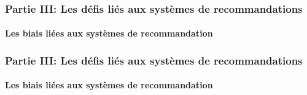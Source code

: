 \begin{frame}

    \frametitle{Partie III: Les défis liés aux systèmes de recommandations}
    \framesubtitle{Les biais liées aux systèmes de recommandation}

    \begin{figure}
        \centering
    \end{figure}

\end{frame}

\begin{frame}

    \frametitle{Partie III: Les défis liés aux systèmes de recommandations}
    \framesubtitle{Les biais liées aux systèmes de recommandation}

    \begin{figure}
        \centering
    \end{figure}

\end{frame}

